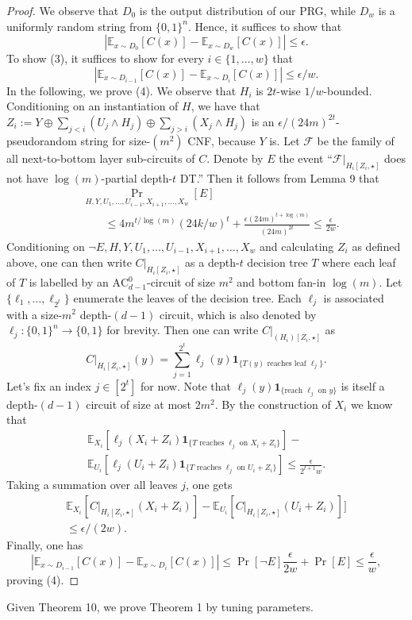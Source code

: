 \documentclass[10pt,a4paper]{article}
\begin{document}
\begin{proof}
We observe that $D_0$ is the output distribution of our PRG, while $D_w$ is a uniformly random string from $\{0,1\}^n$. Hence, it suffices to show that
\[|\mathbb E_{x\sim D_0}[C(x)]-\mathbb E_{x\sim D_w}[C(x)]|\le\epsilon.\tag{3}\]
To show (3), it suffices to show for every $i\in\{1,\ldots,w\}$ that
\[|\mathbb E_{x\sim D_{i-1}}[C(x)]-\mathbb E_{x\sim D_i}[C(x)]|\le\epsilon/w.\tag{4}\]
In the following, we prove (4). We observe that $H_i$ is $2t$-wise $1/w$-bounded. Conditioning on an instantiation of $H$, we have that $Z_i:=Y\oplus\sum_{j<i}(U_j\land H_j)\oplus\sum_{j>i}(X_j\land H_j)$ is an $\epsilon/(24m)^{2t}$-pseudorandom string for size-$(m^2)$ CNF, because $Y$ is. Let $\mathcal F$ be the family of all next-to-bottom layer sub-circuits of $C$. Denote by $E$ the event ``$\mathcal F|_{H_i[Z_i,\star]}$ does not have $\log(m)$-partial depth-$t$ DT.'' Then it follows from Lemma 9 that
\begin{align*}&\Pr_{H,Y,U_1,\ldots,U_{i-1},X_{i+1},\ldots,X_w}[E]\\&\qquad\le4m^{t/\log(m)}(24k/w)^t+\frac{\epsilon(24m)^{t+\log(m)}}{(24m)^{2t}}\le\frac\epsilon{2w}.\end{align*}
Conditioning on $\neg E,H,Y,U_1,\ldots,U_{i-1},X_{i+1},\ldots,X_w$ and calculating $Z_i$ as defined above, one can then write $C|_{H_i[Z_i,\star]}$ as a depth-$t$ decision tree $T$ where each leaf of $T$ is labelled by an $\mathrm{AC}^0_{d-1}$-circuit of size $m^2$ and bottom fan-in $\log(m)$. Let $\{\ell_1,\ldots,\ell_{2^t}\}$ enumerate the leaves of the decision tree. Each $\ell_j$ is associated with a size-$m^2$ depth-$(d-1)$ circuit, which is also denoted by $\ell_j:\{0,1\}^n\to\{0,1\}$ for brevity. Then one can write $C|_{(H_i)[Z_i,\star]}$ as
\[C|_{H_i[Z_i,\star]}(y)=\sum_{j=1}^{2^t}\ell_j(y)\mathbf1_{\{T(y)\text{ reaches leaf }\ell_j\}}.\]
Let's fix an index $j\in[2^t]$ for now. Note that $\ell_j(y)\mathbf1_{\{\text{reach }\ell_j\text{ on }y\}}$ is itself a depth-$(d-1)$ circuit of size at most $2m^2$. By the construction of $X_i$ we know that
\begin{multline*}\mathbb E_{X_i}[\ell_j(X_i+Z_i)\mathbf1_{\{T\text{ reaches }\ell_j\text{ on }X_i+Z_i\}}]-\\\mathbb E_{U_i}[\ell_j(U_i+Z_i)\mathbf1_{\{T\text{ reaches }\ell_j\text{ on }U_i+Z_i\}}]\le\frac\epsilon{2^{t+1}w}.\end{multline*}
Taking a summation over all leaves $j$, one gets
\begin{multline*}\mathbb E_{X_i}[C|_{H_i[Z_i,\star]}(X_i+Z_i)]-\mathbb E_{U_i}[C|_{H_i[Z_i,\star]}(U_i+Z_i)]]\\\le\epsilon/(2w).\end{multline*}
Finally, one has
\[|\mathbb E_{x\sim D_{i-1}}[C(x)]-\mathbb E_{x\sim D_i}[C(x)]|\le\Pr[\neg E]\frac\epsilon{2w}+\Pr[E]\le\frac\epsilon w,\]
proving (4).\end{proof}
Given Theorem 10, we prove Theorem 1 by tuning parameters.
\end{document}
